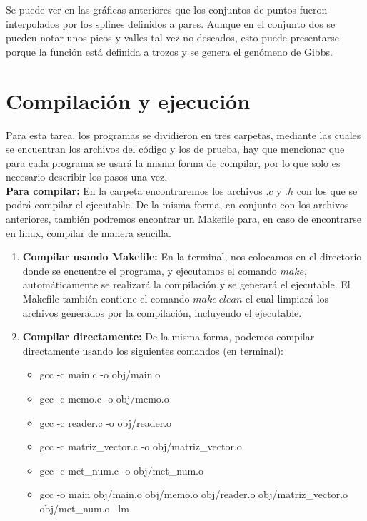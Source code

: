 \documentclass[12pt]{article}
\begin{document}
Se puede ver en las gráficas anteriores que los conjuntos de puntos fueron interpolados por los splines definidos a pares. Aunque en el conjunto dos se pueden notar unos picos y valles tal vez no deseados, esto puede presentarse porque la función está definida a trozos y se genera el genómeno de Gibbs.

\section{Compilación y ejecución}
Para esta tarea, los programas se dividieron en tres carpetas, mediante las cuales se encuentran los archivos del código y los de prueba, hay que mencionar que para cada programa se usará la misma forma de compilar, por lo que solo es necesario describir los pasos una vez.\\

\textbf{Para compilar:} En la carpeta encontraremos los archivos $.c$ y $.h$ con los que se podrá compilar el ejecutable. De la misma forma, en conjunto con los archivos anteriores, también podremos encontrar un Makefile para, en caso de encontrarse en linux, compilar de manera sencilla.

\begin{enumerate}
	\item \textbf{Compilar usando Makefile:} En la terminal, nos colocamos en el directorio donde se encuentre el programa, y ejecutamos el comando $make$, automáticamente se realizará la compilación y se generará el ejecutable. El Makefile también contiene el comando $make\ clean$ el cual limpiará los archivos generados por la compilación, incluyendo el ejecutable.
	\item \textbf{Compilar directamente:} De la misma forma, podemos compilar directamente usando los siguientes comandos (en terminal):
	\begin{itemize}
		\item gcc -c main.c -o obj/main.o
		\item gcc -c memo.c -o obj/memo.o
		\item gcc -c reader.c -o obj/reader.o
		\item gcc -c matriz\_vector.c -o obj/matriz\_vector.o
		\item gcc -c met\_num.c -o obj/met\_num.o
		\item gcc -o main obj/main.o obj/memo.o obj/reader.o obj/matriz\_vector.o obj/met\_num.o\ -lm
	\end{itemize}
\end{enumerate}
\end{document}
